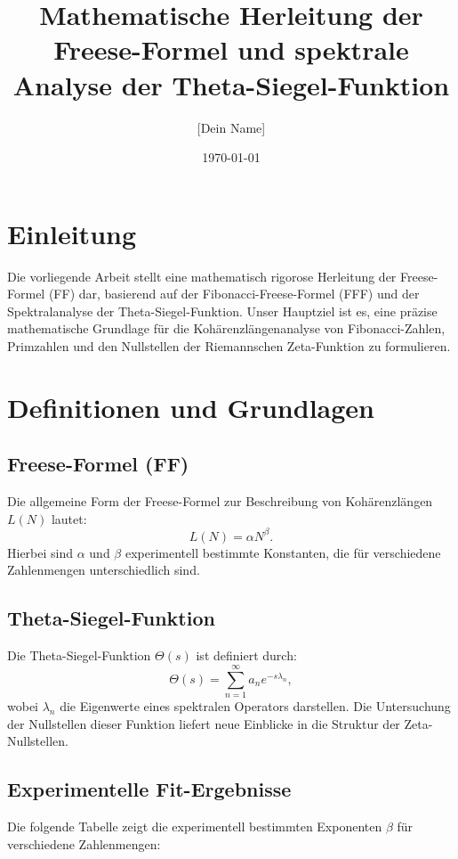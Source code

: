 \documentclass[a4paper,12pt]{article}
\title{Mathematische Herleitung der Freese-Formel und spektrale Analyse der Theta-Siegel-Funktion}
\author{[Dein Name]}
\date{\today}
\begin{document}
\maketitle

\section{Einleitung}
Die vorliegende Arbeit stellt eine mathematisch rigorose Herleitung der Freese-Formel (FF) dar, basierend auf der Fibonacci-Freese-Formel (FFF) und der Spektralanalyse der Theta-Siegel-Funktion. Unser Hauptziel ist es, eine präzise mathematische Grundlage für die Kohärenzlängenanalyse von Fibonacci-Zahlen, Primzahlen und den Nullstellen der Riemannschen Zeta-Funktion zu formulieren.

\section{Definitionen und Grundlagen}

\subsection{Freese-Formel (FF)}
Die allgemeine Form der Freese-Formel zur Beschreibung von Kohärenzlängen $L(N)$ lautet:
\begin{equation}
    L(N) = \alpha N^\beta.
\end{equation}
Hierbei sind $\alpha$ und $\beta$ experimentell bestimmte Konstanten, die für verschiedene Zahlenmengen unterschiedlich sind.

\subsection{Theta-Siegel-Funktion}
Die Theta-Siegel-Funktion $\Theta(s)$ ist definiert durch:
\begin{equation}
    \Theta(s) = \sum_{n=1}^{\infty} a_n e^{-s\lambda_n},
\end{equation}
wobei $\lambda_n$ die Eigenwerte eines spektralen Operators darstellen. Die Untersuchung der Nullstellen dieser Funktion liefert neue Einblicke in die Struktur der Zeta-Nullstellen.

\subsection{Experimentelle Fit-Ergebnisse}
Die folgende Tabelle zeigt die experimentell bestimmten Exponenten $\beta$ für verschiedene Zahlenmengen:
\end{document}
